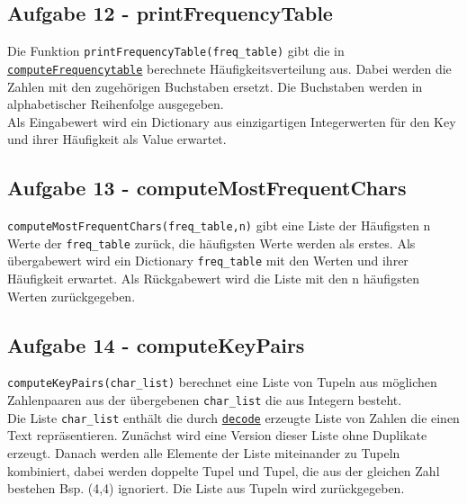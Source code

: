 \documentclass[12pt]{article}
\begin{document}
		\subsection{Aufgabe 12 - printFrequencyTable}
			Die Funktion \texttt{printFrequencyTable(freq\_table)} gibt die in \hyperref[ssec:Aufgabe11]{\texttt{computeFrequencytable}} berechnete H\"aufigkeitsverteilung aus. Dabei werden die Zahlen mit den zugeh\"origen Buchstaben ersetzt. Die Buchstaben werden in alphabetischer Reihenfolge ausgegeben.\\
Als Eingabewert wird ein Dictionary aus einzigartigen Integerwerten f\"ur den Key und ihrer H\"aufigkeit als Value erwartet.
			
			
		\subsection{\label{ssec:Aufgabe13}Aufgabe 13 - computeMostFrequentChars}
		\texttt{computeMostFrequentChars(freq\_table,n)} gibt eine Liste der H\"aufigsten n Werte der \texttt{freq\_table}
zur\"uck, die h\"aufigsten Werte werden als erstes. 
Als \"ubergabewert wird ein Dictionary \texttt{freq\_table} mit den Werten und ihrer H\"aufigkeit erwartet. 
Als R\"uckgabewert wird die Liste mit den n h\"aufigsten Werten zur\"uckgegeben.
			
			
		\subsection{\label{ssec:Aufgabe14}Aufgabe 14 - computeKeyPairs}
			\texttt{computeKeyPairs(char\_list)} berechnet eine Liste von Tupeln aus m\"oglichen Zahlenpaaren aus der \"ubergebenen \texttt{char\_list} die aus Integern besteht.\\
Die Liste \texttt{char\_list} enth\"alt die durch \hyperref[ssec:Aufgabe1]{\texttt{decode}} erzeugte Liste von Zahlen die einen Text repr\"asentieren.
Zun\"achst wird eine Version dieser Liste ohne Duplikate erzeugt. Danach werden alle Elemente der Liste miteinander zu Tupeln kombiniert, dabei werden doppelte Tupel und Tupel, die 
aus der gleichen Zahl bestehen Bsp. (4,4) ignoriert.
Die Liste aus Tupeln wird zur\"uckgegeben.\\
			
			
\end{document}
